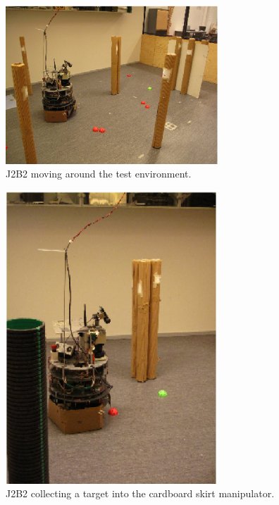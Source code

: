 \documentclass[a4paper,10pt]{article}
\begin{document}
\begin{figure}[h]	%
\begin{center}
\includegraphics[width=8.0cm]{j2b2_world.eps}
\caption{J2B2 moving around the test environment.}
\label{world} %
\end{center}
\end{figure}

\begin{figure}[!]	%
\begin{center}
\includegraphics[width=8.0cm]{collect_target.eps}
\caption{J2B2 collecting a target into the cardboard skirt manipulator.}
\label{target} %
\end{center}
\end{figure}
\end{document}
